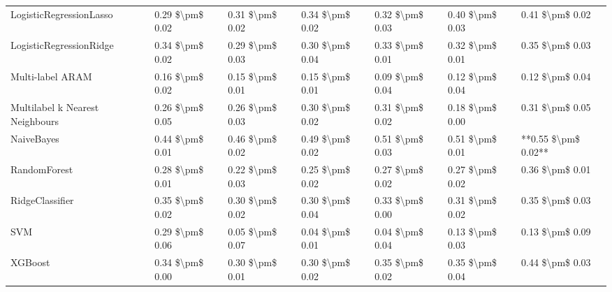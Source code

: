 \begin{tabular}{lllllll}
LogisticRegressionLasso         &  0.29 \$\textbackslash pm\$ 0.02 &           0.31 \$\textbackslash pm\$ 0.02 &       0.34 \$\textbackslash pm\$ 0.02 &        0.32 \$\textbackslash pm\$ 0.03 &                         0.40 \$\textbackslash pm\$ 0.03 &      0.41 \$\textbackslash pm\$ 0.02 \\
LogisticRegressionRidge         &  0.34 \$\textbackslash pm\$ 0.02 &           0.29 \$\textbackslash pm\$ 0.03 &       0.30 \$\textbackslash pm\$ 0.04 &        0.33 \$\textbackslash pm\$ 0.01 &                         0.32 \$\textbackslash pm\$ 0.01 &      0.35 \$\textbackslash pm\$ 0.03 \\
Multi-label ARAM                &  0.16 \$\textbackslash pm\$ 0.02 &           0.15 \$\textbackslash pm\$ 0.01 &       0.15 \$\textbackslash pm\$ 0.01 &        0.09 \$\textbackslash pm\$ 0.04 &                         0.12 \$\textbackslash pm\$ 0.04 &      0.12 \$\textbackslash pm\$ 0.04 \\
Multilabel k Nearest Neighbours &  0.26 \$\textbackslash pm\$ 0.05 &           0.26 \$\textbackslash pm\$ 0.03 &       0.30 \$\textbackslash pm\$ 0.02 &        0.31 \$\textbackslash pm\$ 0.02 &                         0.18 \$\textbackslash pm\$ 0.00 &      0.31 \$\textbackslash pm\$ 0.05 \\
NaiveBayes                      &  0.44 \$\textbackslash pm\$ 0.01 &           0.46 \$\textbackslash pm\$ 0.02 &       0.49 \$\textbackslash pm\$ 0.02 &        0.51 \$\textbackslash pm\$ 0.03 &                         0.51 \$\textbackslash pm\$ 0.01 &  **0.55 \$\textbackslash pm\$ 0.02** \\
RandomForest                    &  0.28 \$\textbackslash pm\$ 0.01 &           0.22 \$\textbackslash pm\$ 0.03 &       0.25 \$\textbackslash pm\$ 0.02 &        0.27 \$\textbackslash pm\$ 0.02 &                         0.27 \$\textbackslash pm\$ 0.02 &      0.36 \$\textbackslash pm\$ 0.01 \\
RidgeClassifier                 &  0.35 \$\textbackslash pm\$ 0.02 &           0.30 \$\textbackslash pm\$ 0.02 &       0.30 \$\textbackslash pm\$ 0.04 &        0.33 \$\textbackslash pm\$ 0.00 &                         0.31 \$\textbackslash pm\$ 0.02 &      0.35 \$\textbackslash pm\$ 0.03 \\
SVM                             &  0.29 \$\textbackslash pm\$ 0.06 &           0.05 \$\textbackslash pm\$ 0.07 &       0.04 \$\textbackslash pm\$ 0.01 &        0.04 \$\textbackslash pm\$ 0.04 &                         0.13 \$\textbackslash pm\$ 0.03 &      0.13 \$\textbackslash pm\$ 0.09 \\
XGBoost                         &  0.34 \$\textbackslash pm\$ 0.00 &           0.30 \$\textbackslash pm\$ 0.01 &       0.30 \$\textbackslash pm\$ 0.02 &        0.35 \$\textbackslash pm\$ 0.02 &                         0.35 \$\textbackslash pm\$ 0.04 &      0.44 \$\textbackslash pm\$ 0.03 \\
\bottomrule
\end{tabular}
